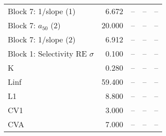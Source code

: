 \documentclass[
]{article}
\begin{document}
\begin{landscape}
\begin{longtable}[t]{lrrrr}
Block 7: 1/slope (1) & 6.672 & -- & -- & --\\
Block 7: $a_{50}$ (2) & 20.000 & -- & -- & --\\
Block 7: 1/slope (2) & 6.912 & -- & -- & --\\
\addlinespace
Block 1: Selectivity RE $\sigma$ & 0.100 & -- & -- & --\\
K & 0.280 & -- & -- & --\\
Linf & 59.400 & -- & -- & --\\
L1 & 8.800 & -- & -- & --\\
CV1 & 3.000 & -- & -- & --\\
\addlinespace
CVA & 7.000 & -- & -- & --\\*
\end{longtable}
\end{landscape}
\end{document}

